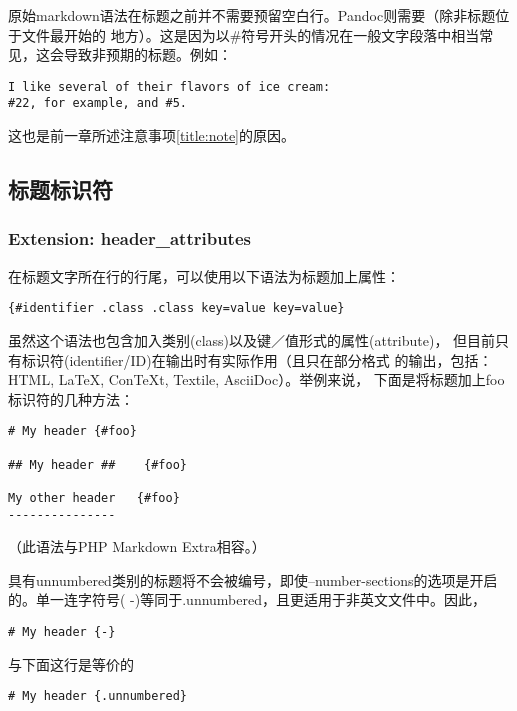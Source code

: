 \documentclass[fancyhdr,bookmark]{ctexbook}
\begin{document}
原始markdown语法在标题之前并不需要预留空白行。Pandoc则需要（除非标题位于文件最开始的
地方）。这是因为以\#符号开头的情况在一般文字段落中相当常见，这会导致非预期的标题。例如：

\begin{lstlisting}
I like several of their flavors of ice cream:
#22, for example, and #5.
\end{lstlisting}

这也是前一章所述注意事项\ref{title:note}的原因。

\hypertarget{ux6807ux9898ux6807ux8bc6ux7b26}{%
\subsection{标题标识符}\label{ux6807ux9898ux6807ux8bc6ux7b26}}

\hypertarget{extension-header_attributes}{%
\subsubsection{Extension:
header\_attributes}\label{extension-header_attributes}}

在标题文字所在行的行尾，可以使用以下语法为标题加上属性：

\begin{lstlisting}
{#identifier .class .class key=value key=value}
\end{lstlisting}

虽然这个语法也包含加入类别(class)以及键／值形式的属性(attribute)，
但目前只有标识符(identifier/ID)在输出时有实际作用（且只在部分格式
的输出，包括：HTML, LaTeX, ConTeXt, Textile, AsciiDoc）。举例来说，
下面是将标题加上foo标识符的几种方法：

\begin{lstlisting}
# My header {#foo}

## My header ##    {#foo}

My other header   {#foo}
---------------
\end{lstlisting}

（此语法与PHP Markdown Extra相容。）

具有unnumbered类别的标题将不会被编号，即使--number-sections的选项是开启
的。单一连字符号( -)等同于.unnumbered，且更适用于非英文文件中。因此，

\begin{lstlisting}
# My header {-}
\end{lstlisting}

与下面这行是等价的

\begin{lstlisting}
# My header {.unnumbered}
\end{lstlisting}
\end{document}
